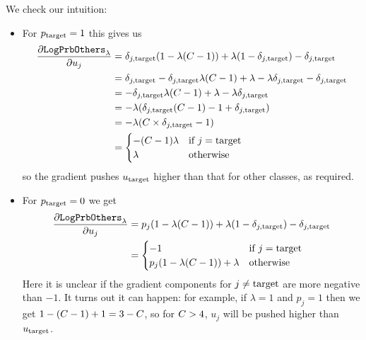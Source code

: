 \documentclass[../main.tex]{subfiles}
\begin{document}
We check our intuition:
\begin{itemize}
    \item For $p_{\mathrm{target}} = 1$ this gives us
          \begin{align*}
              \frac{\partial \mathtt{LogPrbOthers}_{\lambda}}{\partial u_j}
               & = \delta_{j, \mathrm{target}} (1 - \lambda (C - 1)) + \lambda (1 - \delta_{j, \mathrm{target}}) - \delta_{j, \mathrm{target}}      \\
               & = \delta_{j, \mathrm{target}} - \delta_{j, \mathrm{target}} \lambda (C - 1) + \lambda - \lambda \delta_{j, \mathrm{target}} - \delta_{j, \mathrm{target}} \\
               & = - \delta_{j, \mathrm{target}} \lambda (C - 1) + \lambda - \lambda \delta_{j, \mathrm{target}}             \\
               & = - \lambda (\delta_{j, \mathrm{target}} (C - 1) - 1 + \delta_{j, \mathrm{target}})                         \\
               & = - \lambda (C \times \delta_{j, \mathrm{target}} - 1)                                      \\
               & = \begin{cases}
                       - (C - 1) \lambda & \text{if } j = \mathrm{target} \\
                       \lambda                    & \text{otherwise}
                   \end{cases}
          \end{align*}
          so the gradient pushes $u_{\mathrm{target}}$ higher than that for other classes, as required.

    \item For $p_{\mathrm{target}} = 0$ we get
          \begin{align*}
              \frac{\partial \mathtt{LogPrbOthers}_{\lambda}}{\partial u_j}
               & = p_j (1 - \lambda (C - 1)) + \lambda (1 - \delta_{j, \mathrm{target}}) - \delta_{j, \mathrm{target}}        \\
               & = \begin{cases}
                       -1                                           & \text{if } j = \mathrm{target} \\
                       p_j(1 - \lambda ( C -1 )) + \lambda & \text{otherwise}
                   \end{cases}
          \end{align*}
Here it is unclear if the gradient components for $j \neq \mathrm{target}$ are more negative than $-1$.
It turns out it can happen: for example, if $\lambda = 1$ and $p_j = 1$ then we get $1 - (C -1) + 1 = 3 - C$, so for $C > 4$, $u_j$ will be pushed higher than $u_{\mathrm{target}}$.
\end{itemize}
\end{document}

